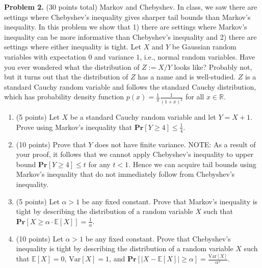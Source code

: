 \documentclass[11pt]{article}
\newcommand{\Ex}[1]{\ensuremath{\mathbb{E}\left[#1\right]}}
\newcommand{\Var}[1]{\ensuremath{\text{Var}\left[#1\right]}}
\newcommand{\PPr}[1]{\ensuremath{\mathbf{Pr}\left[#1\right]}}
\begin{document}
\vskip 0.2in\noindent
\textbf{Problem 2.} (30 points total)
Markov and Chebyshev.
\vskip 0.1in\noindent
In class, we saw there are settings where Chebyshev's inequality gives sharper tail bounds than Markov's inequality. In this problem we show that 1) there are settings where Markov's inequality can be more informative than Chebyshev's inequality and 2) there are settings where either inequality is tight. 
\vskip 0.1in\noindent
Let $X$ and $Y$ be Gaussian random variables with expectation $0$ and variance $1$, i.e., normal random variables. Have you ever wondered what the distribution of $Z:=X/Y$ looks like? Probably not, but it turns out that the distribution of $Z$ has a name and is well-studied. $Z$ is a standard Cauchy random variable and follows the standard Cauchy distribution, which has probability density function $p(x)=\frac{1}{\pi}\frac{1}{(1+x)^2}$ for all $x\in\mathbb{R}$. 
\begin{enumerate}
\item (5 points)
Let $X$ be a standard Cauchy random variable and let $Y=X+1$. 
Prove using Markov's inequality that $\PPr{Y\ge 4}\le\frac{1}{4}$. 
\item (10 points)
Prove that $Y$ does not have finite variance. 
\vskip 0.1in\noindent
NOTE: As a result of your proof, it follows that we cannot apply Chebyshev's inequality to upper bound $\PPr{Y\ge 4}\le t$ for any $t<1$. Hence we can acquire tail bounds using Markov's inequality that do not immediately follow from Chebyshev's inequality.
\item (5 points)
Let $\alpha>1$ be any fixed constant. 
Prove that Markov's inequality is tight by describing the distribution of a random variable $X$ such that $\PPr{X\ge\alpha\cdot\Ex{X}}=\frac{1}{\alpha}$. 
\item (10 points)
Let $\alpha>1$ be any fixed constant. 
Prove that Chebyshev's inequality is tight by describing the distribution of a random variable $X$ such that $\Ex{X}=0$, $\Var{X}=1$, and $\PPr{|X-\Ex{X}|\ge\alpha}=\frac{\Var{X}}{\alpha^2}$. 
\end{enumerate}
\end{document}

